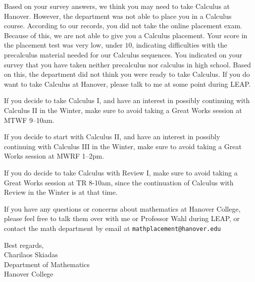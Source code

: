\documentclass[12pt]{article}
\begin{document}
      Based on your survey answers, we think you may need to take Calculus at Hanover. However, the department was not able to place you in a Calculus course.
        According to our records, you did not take the online placement exam. Because of this, we are not able to give you a Calculus placement.
      	Your score in the placement test was very low, under \( 10 \), indicating difficulties with the precalculus material needed for our Calculus sequences.
          You indicated on your survey that you have taken neither precalculus nor calculus in high school.
	      Based on this, the department did not think you were ready to take Calculus. 
      If you do want to take Calculus at Hanover, please talk to me at some point during LEAP.



    If you decide to take Calculus I, and have an interest in possibly continuing with Calculus II in the Winter, make sure to avoid taking a Great Works session at MTWF 9--10am.
    
    If you decide to start with Calculus II, and have an interest in possibly continuing with Calculus III in the Winter, make sure to avoid taking a Great Works session at MWRF 1--2pm.
    
    If you do decide to take Calculus with Review I, make sure to avoid taking a Great Works session at TR 8-10am, since the continuation of Calculus with Review in the Winter is at that time.

		If you have any questions or concerns about mathematics at Hanover College, please feel free to talk them over with me or Professor Wahl during LEAP, or contact the math department by email at \texttt{mathplacement@hanover.edu}
		\vspace{0.5in}

		\noindent Best regards,\\
		Charilaos Skiadas\\
		Department of Mathematics\\
		Hanover College
\end{document}
